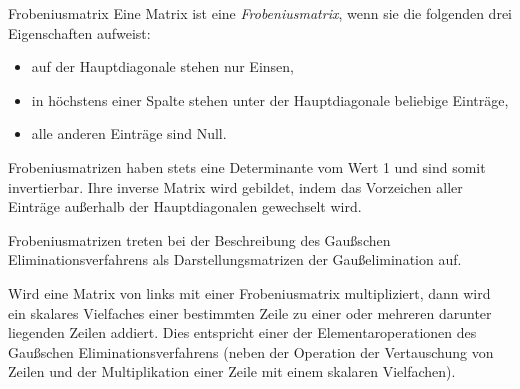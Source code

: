 \begin{defi}{Frobeniusmatrix}
    Eine Matrix ist eine \emph{Frobeniusmatrix}, wenn sie die folgenden drei Eigenschaften aufweist:
    \begin{itemize}
        \item auf der Hauptdiagonale stehen nur Einsen,
        \item in höchstens einer Spalte stehen unter der Hauptdiagonale beliebige Einträge,
        \item alle anderen Einträge sind Null.
    \end{itemize}

    Frobeniusmatrizen haben stets eine Determinante vom Wert 1 und sind somit invertierbar.
    Ihre inverse Matrix wird gebildet, indem das Vorzeichen aller Einträge außerhalb der Hauptdiagonalen gewechselt wird.

    Frobeniusmatrizen treten bei der Beschreibung des Gaußschen Eliminationsverfahrens als Darstellungsmatrizen der Gaußelimination auf.

    Wird eine Matrix von links mit einer Frobeniusmatrix multipliziert, dann wird ein skalares Vielfaches einer bestimmten Zeile zu einer oder mehreren darunter liegenden Zeilen addiert.
    Dies entspricht einer der Elementaroperationen des Gaußschen Eliminationsverfahrens (neben der Operation der Vertauschung von Zeilen und der Multiplikation einer Zeile mit einem skalaren Vielfachen).
\end{defi}

